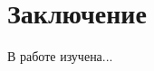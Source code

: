 \documentclass[a4paper,14pt]{article}
\begin{document}
    \newpage


    \section{Заключение}

    В работе изучена...

    \newpage
    \renewcommand{\refname}{{\normalsize \hfill Список использованных источников \hfill}}
%    
    
    
    \newpage
\end{document}
